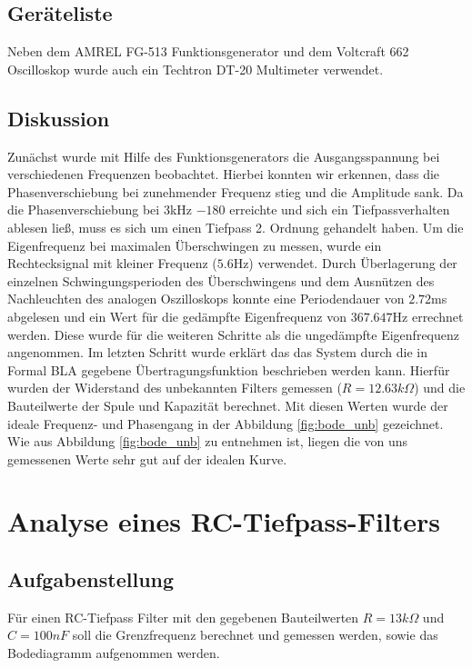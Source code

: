 \documentclass[12pt,a4paper,ngerman]{article}
\begin{document}
\subsection{Geräteliste}
Neben dem AMREL FG-513 Funktionsgenerator und dem Voltcraft 662 Oscilloskop wurde auch ein Techtron DT-20 Multimeter verwendet.
\subsection{Diskussion}

Zunächst wurde mit Hilfe des Funktionsgenerators die Ausgangsspannung bei verschiedenen Frequenzen beobachtet. Hierbei konnten wir erkennen, dass die Phasenverschiebung bei zunehmender Frequenz stieg und die Amplitude sank. Da die Phasenverschiebung bei 3kHz $-180$ erreichte und sich ein Tiefpassverhalten ablesen ließ, muss es sich um einen Tiefpass 2. Ordnung gehandelt haben.
Um die Eigenfrequenz bei maximalen Überschwingen zu messen, wurde ein Rechtecksignal mit kleiner Frequenz ($5.6$Hz) verwendet. Durch Überlagerung der einzelnen Schwingungsperioden des Überschwingens und dem Ausnützen des Nachleuchten des analogen Oszilloskops konnte eine Periodendauer von $2.72$ms abgelesen und ein Wert für die gedämpfte Eigenfrequenz von $367.647$Hz errechnet werden. Diese wurde für die weiteren Schritte als die ungedämpfte Eigenfrequenz angenommen. 
Im letzten Schritt wurde erklärt das das System durch die in Formal BLA gegebene Übertragungsfunktion beschrieben werden kann. Hierfür wurden der Widerstand des unbekannten Filters gemessen ($R = 12.63k\Omega$) und die Bauteilwerte der Spule und Kapazität berechnet. Mit diesen Werten wurde der ideale Frequenz- und Phasengang in der Abbildung \ref{fig:bode_unb} gezeichnet. Wie aus Abbildung \ref{fig:bode_unb} zu entnehmen ist, liegen die von uns gemessenen Werte sehr gut auf der idealen Kurve.



\pagebreak
\section{Analyse eines RC-Tiefpass-Filters}
\subsection{Aufgabenstellung}
Für einen RC-Tiefpass Filter mit den gegebenen Bauteilwerten $R = 13k\Omega$ und $C = 100 nF$ soll die Grenzfrequenz berechnet und gemessen werden, sowie das Bodediagramm aufgenommen werden.
\end{document}
